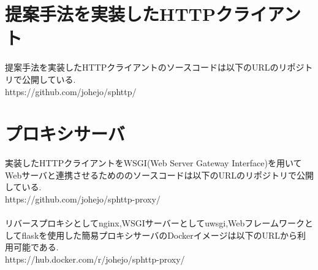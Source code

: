 \documentclass[a4j,12pt]{gradthesis_utf8}
\begin{document}
\begin{appendix}
	\label{appendix}
	\chapter{提案手法を実装したHTTPクライアント}
	提案手法を実装したHTTPクライアントのソースコードは以下のURLのリポジトリで公開している.\\
	https://github.com/johejo/sphttp/
	
	\chapter{プロキシサーバ}
	実装したHTTPクライアントをWSGI(Web Server Gateway Interface)を用いてWebサーバと連携させるためののソースコードは以下のURLのリポジトリで公開している.\\
	https://github.com/johejo/sphttp-proxy/ \\ \\
	リバースプロキシとしてnginx,WSGIサーバーとしてuwsgi,Webフレームワークとしてflaskを使用した簡易プロキシサーバのDockerイメージは以下のURLから利用可能である.\\
	https://hub.docker.com/r/johejo/sphttp-proxy/ \\
	
\end{appendix}
\end{document}
